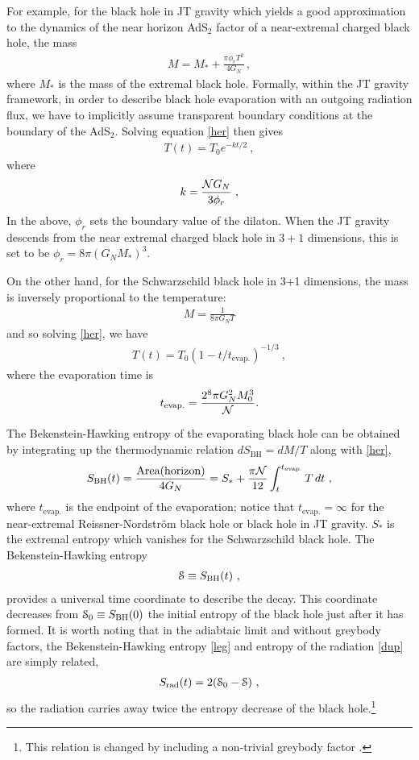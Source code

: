 \documentclass[12pt]{article}
\newcommand\SBH{S_\text{BH}}
\newcommand\ZZ{\EuScript S}
\newcommand{\EQ}[1]{\begin{equation}\begin{split} #1
\end{split}\end{equation}}
\begin{document}
For example, for the black hole in JT gravity \cite{Jackiw:1984je, Teitelboim:1983ux} which yields a good approximation to the dynamics of the near horizon AdS$_2$ factor of a 
near-extremal charged black hole, the mass
\EQ{
M=M_*+\frac{\pi\phi_rT^2}{4G_N}\,,
}
where $M_*$ is the mass of the extremal black hole. Formally, within the JT gravity framework, in order to describe black hole evaporation with an outgoing radiation flux, we have to implicitly assume transparent boundary conditions at the boundary of the AdS$_2$. Solving equation \eqref{her} then gives
\EQ{
T(t)=T_0e^{-kt/2}\ ,
\label{bot}
}
where
\EQ{
k=\frac{{\cal N}G_N}{3\phi_r}\ ,
\label{sew}
}
In the above, $\phi_r$ sets the boundary value of the dilaton. When the JT gravity descends from the near extremal charged black hole in $3+1$ dimensions, this is set to be $\phi_r=8\pi(G_NM_*)^3$. 

On the other hand, for the Schwarzschild black hole in 3+1 dimensions, the mass is inversely proportional to the temperature:
\EQ{
M=\frac1{8\pi G_NT}
}
and so solving \eqref{her}, we have
\EQ{
T(t)=T_0(1-t/t_\text{evap.})^{-1/3}\ ,
\label{bat}
}
where the evaporation time is
\EQ{
t_\text{evap.}=\frac{2^8\pi G_N^2M_0^3}{\cal N} .
\label{fit}
}

The Bekenstein-Hawking entropy of the evaporating black hole can be obtained by integrating up the thermodynamic relation $d\SBH =dM/T$ along with \eqref{her},
\EQ{
\SBH(t)=\frac{\text{Area}(\text{horizon})}{4G_N}=S_*+\frac{\pi{\cal N}}{12}\int^{t_\text{evap.}}_t T\,dt\ ,
\label{leg}
}
where $t_\text{evap.}$ is the endpoint of the evaporation; notice that $t_\text{evap.} = \infty$ for the near-extremal Reissner-Nordstr\"om black hole or black hole in JT gravity. $S_*$ is the extremal entropy which vanishes for the Schwarzschild black hole. The Bekenstein-Hawking entropy 
\EQ{
\ZZ\equiv\SBH(t)\ ,\label{zz}
} 
provides a universal time coordinate to describe the decay. This coordinate decreases from $\ZZ_0\equiv \SBH (0)$ the initial entropy of the black hole just after it has formed. It is worth noting that in the adiabtaic limit and without greybody factors, the Bekenstein-Hawking entropy \eqref{leg} and entropy of the radiation \eqref{dup} are simply related,
\EQ{
S_\text{rad}(t)=2(\ZZ_0-\ZZ)\ ,
}
so the  radiation carries away twice the entropy decrease of the  black hole.\footnote{This  relation is changed by including a non-trivial greybody factor \cite{Page:1993wv,Page:2013dx}.}
\end{document}
